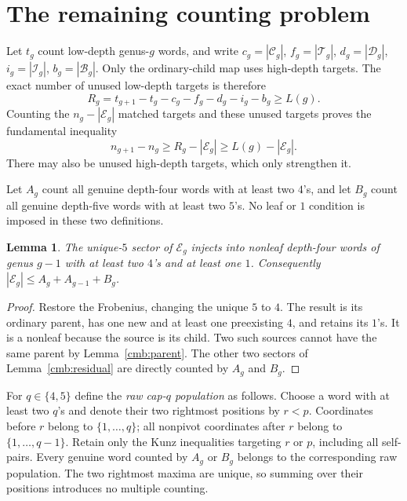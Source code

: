 \documentclass[11pt]{amsart}
\newtheorem{lemma}[theorem]{Lemma}
\theoremstyle{definition}
\theoremstyle{remark}
\numberwithin{equation}{section}
\begin{document}
\section{The remaining counting problem}
\label{cmb:envelope}
Let $t_g$ count low-depth genus-$g$ words, and write
$c_g=|\mathcal C_g|$, $f_g=|\mathcal T_g|$,
$d_g=|\mathcal D_g|$, $i_g=|\mathcal I_g|$, $b_g=|\mathcal B_g|$.
Only the ordinary-child map uses high-depth targets. The exact number of
unused low-depth targets is therefore
\begin{equation}\label{cmb:exact-capacity}
 R_g=t_{g+1}-t_g-c_g-f_g-d_g-i_g-b_g\ge L(g).
\end{equation}
Counting the $n_g-|\mathcal E_g|$ matched targets and these unused targets
proves the fundamental inequality
\begin{equation}\label{cmb:fundamental}
 n_{g+1}-n_g\ge R_g-|\mathcal E_g|\ge L(g)-|\mathcal E_g|.
\end{equation}
There may also be unused high-depth targets, which only strengthen it.

Let $A_g$ count all genuine depth-four words with at least two $4$'s, and
let $B_g$ count all genuine depth-five words with at least two $5$'s.
No leaf or $1$ condition is imposed in these two definitions.

\begin{lemma}\label{cmb:parent-reduction}
The unique-$5$ sector of $\mathcal E_g$ injects into nonleaf depth-four
words of genus $g-1$ with at least two $4$'s and at least one $1$.
Consequently $|\mathcal E_g|\le A_g+A_{g-1}+B_g$.
\end{lemma}
\begin{proof}
Restore the Frobenius, changing the unique $5$ to $4$. The result is its
ordinary parent, has one new and at least one preexisting $4$, and retains
its $1$'s. It is a nonleaf because the source is its child. Two such sources
cannot have the same parent by Lemma~\ref{cmb:parent}. The other two
sectors of Lemma~\ref{cmb:residual} are directly counted by $A_g$ and $B_g$.
\end{proof}

For $q\in\{4,5\}$ define the \emph{raw cap-$q$ population} as follows.
Choose a word with at least two $q$'s and denote their two rightmost
positions by $r<p$. Coordinates before $r$ belong to $\{1,\ldots,q\}$;
all nonpivot coordinates after $r$ belong to $\{1,\ldots,q-1\}$.
Retain only the Kunz inequalities targeting $r$ or $p$, including all
self-pairs. Every genuine word counted by $A_g$ or $B_g$ belongs to the
corresponding raw population. The two rightmost maxima are unique, so
summing over their positions introduces no multiple counting.
\end{document}
